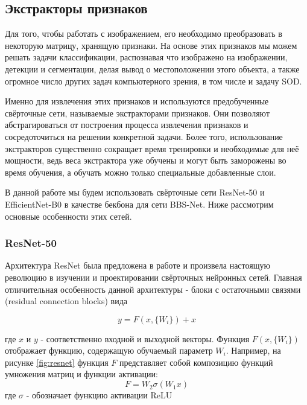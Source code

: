 \subsection{Экстракторы признаков}

Для того, чтобы работать с изображением, его необходимо преобразовать
в некоторую матрицу, хранящую признаки. На основе этих 
признаков мы можем решать задачи классификации, распознавая что изображено на изображении,
детекции и сегментации, делая вывод о местоположении этого объекта,
а также огромное число других задач компьютерного зрения, в том числе и задачу SOD.

Именно для извлечения этих признаков и используются предобученные свёрточные сети, называемые экстракторами признаков. Они позволяют 
абстрагироваться от построения процесса извлечения признаков и сосредоточиться на решении конкретной задачи.
Более того, использование экстракторов существенно сокращает время тренировки и необходимые для неё мощности,
ведь веса экстрактора уже обучены и могут быть заморожены во время обучения, а обучать можно только специальные добавленные слои.


В данной работе мы будем использовать свёрточные сети ResNet-50\cite{ResNet} и EfficientNet-B0\cite{Efficientnet} 
в качестве бекбона для сети BBS-Net\cite{BBS}. Ниже рассмотрим основные особенности этих сетей.

\subsubsection{ResNet-50}

Архитектура ResNet была предложена в работе \cite{ResNet} и произвела настоящую революцию 
в изучении и проектировании свёрточных нейронных сетей. Главная отличительная особенность данной архитектуры -
блоки с остаточными связями (residual connection blocks) вида

\begin{equation}
    y = F(x, \{W_i\}) + x 
\end{equation}

где $x$ и $y$ - соответственно входной и выходной векторы. Функция $F(x, \{W_i\})$ отображает 
функцию, содержащую обучаемый параметр $W_i$. Например, на рисунке \ref{fig:resnet} функция $F$ 
представляет собой композицию функций умножения матриц и функции активации:
\begin{equation}
    F = W_2 \sigma(W_1x)
\end{equation}
где $\sigma$ - обозначает функцию активации ReLU\cite{ReLU}

